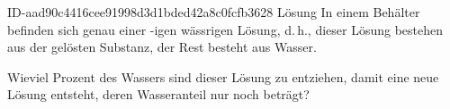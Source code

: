 \begin{exercise}
      {ID-aad90c4416cee91998d3d1bded42a8c0fcfb3628}
      {Lösung}
  \ifproblem\problem
    In einem Behälter befinden sich genau  einer -igen wässrigen
    Lösung, d.\,h.,  dieser Lösung bestehen aus der gelösten Substanz,
    der Rest besteht aus Wasser.\par
    Wieviel Prozent des Wassers sind dieser Lösung zu entziehen, damit eine
    neue Lösung entsteht, deren Wasseranteil nur noch  beträgt?
  \fi
\end{exercise}
